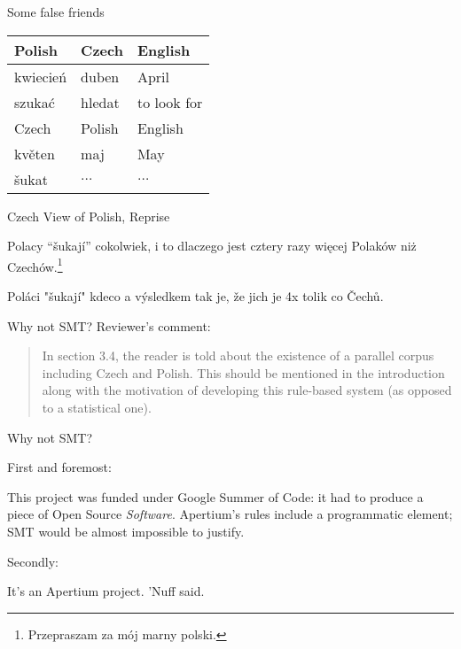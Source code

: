 \documentclass{beamer}
\begin{document}
\begin{frame}{Some false friends}
\begin{center}
    \begin{tabular}{ | l | l | l |}
    \hline
     Polish & Czech & English \\ 
     \hline
     kwiecie\'{n} & duben & April \\
     szuka\'{c} & hledat & to look for \\    
     \hline
     Czech & Polish & English \\ 
     \hline
     květen & maj & May \\
     \v{s}ukat & $\dots$ & $\dots$ \\
    \hline
    \end{tabular}
\end{center}
\end{frame}

\begin{frame}{Czech View of Polish, Reprise}

Polacy ``šukají'' cokolwiek, i to dlaczego jest cztery razy więcej Polaków
niż Czechów.\footnote{Przepraszam za mój marny polski.}

{\footnotesize Poláci "šukají" kdeco a výsledkem tak je, že jich je 4x tolik co Čechů.}
\end{frame}



\begin{frame}{Why not SMT?}
Reviewer's comment:

\begin{quote}
In section 3.4, the reader is told about the existence of a parallel corpus 
including Czech and Polish. This should be mentioned in the introduction along 
with the motivation of developing this rule-based system 
(as opposed to a statistical one).
\end{quote}

%
%
%

\end{frame}

\begin{frame}{Why not SMT?}

First and foremost:

This project was funded under Google Summer of Code: it had to produce a piece
of Open Source {\em Software}. Apertium's rules include a programmatic element;
SMT would be almost impossible to justify.

\pause

Secondly:

It's an Apertium project. 'Nuff said.

\end{frame}
\end{document}
